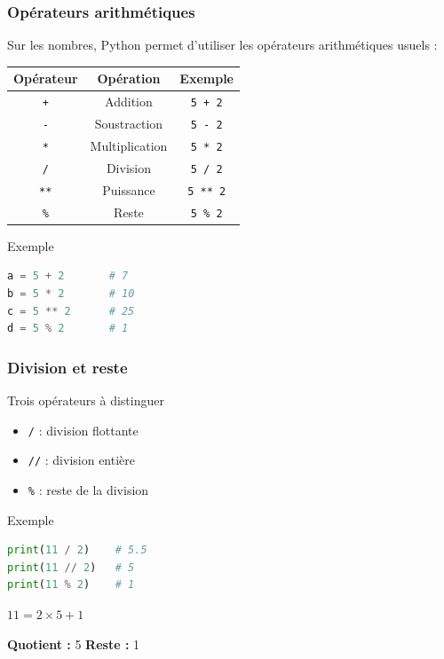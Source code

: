 \documentclass[10pt]{beamer}
\begin{document}
\begin{frame}[containsverbatim]
\frametitle{Opérateurs arithmétiques}

Sur les nombres, Python permet d'utiliser les opérateurs arithmétiques
usuels :

\begin{center}
\begin{tabular}{c|c|c}
\textbf{Opérateur} & \textbf{Opération} & \textbf{Exemple} \\ \hline
\texttt{+} & Addition & \texttt{5 + 2} \\
\texttt{-} & Soustraction & \texttt{5 - 2} \\
\texttt{*} & Multiplication & \texttt{5 * 2} \\
\texttt{/} & Division & \texttt{5 / 2} \\
\texttt{**} & Puissance & \texttt{5 ** 2} \\
\texttt{\%} & Reste & \texttt{5 \% 2}
\end{tabular}
\end{center}

\vspace{0.3cm}

\begin{exampleblock}{Exemple}
\begin{lstlisting}[language=Python]
a = 5 + 2       # 7
b = 5 * 2       # 10
c = 5 ** 2      # 25
d = 5 % 2       # 1
\end{lstlisting}
\end{exampleblock}

\end{frame}

\begin{frame}[containsverbatim]
\frametitle{Division et reste}

\begin{block}{Trois opérateurs à distinguer}
\begin{itemize}
\item \texttt{/} : division flottante
\item \texttt{//} : division entière
\item \texttt{\%} : reste de la division
\end{itemize}
\end{block}

\vspace{0.2cm}

\begin{exampleblock}{Exemple}
\begin{lstlisting}[language=Python]
print(11 / 2)    # 5.5
print(11 // 2)   # 5
print(11 % 2)    # 1
\end{lstlisting}
\end{exampleblock}

\vspace{0.15cm}

\begin{center}
$11 = 2 \times 5 + 1$

\vspace{0.1cm}

\textbf{Quotient : } 5
\qquad
\textbf{Reste : } 1
\end{center}

\end{frame}
\end{document}
